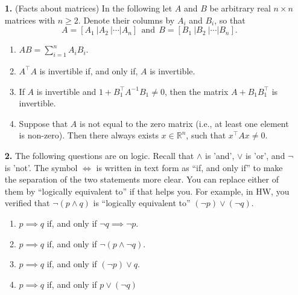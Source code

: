 \documentclass[letterpaper]{article}
\newcommand{\real}{\mathbb R}  %
\begin{document}
\begin{enumerate}
\setlength{\itemsep}{5cm}


\item[{\bf 1.}]  (Facts about matrices) In the following let $A$ and $B$ be arbitrary real $n \times n$ matrices with $n\ge 2$. Denote their columns by $A_i$ and $B_i$, so that $$A=[A_1~| A_2~| \cdots |A_n]~~\text{and}~~B=[B_1~| B_2~| \cdots |B_n].$$
\begin{enumerate}
\setlength{\itemsep}{.15in}
\renewcommand{\labelenumi}{(\alph{enumi})}
\setlength{\itemsep}{.1in}
\item $AB = \sum_{i=1}^{n} A_i B_i$.
\item $A^{\top} A$ is invertible if, and only if, $A$ is invertible.
\item If $A$ is invertible and $1+B_1^{\top} A^{-1} B_1 \neq 0$, then the matrix $A+ B_1 B_1^{\top}$ is invertible.
\item Suppose that $A$ is not equal to the zero matrix (i.e., at least one element is non-zero). Then there always exists $x \in \real^n$, such that $x^{\top} A x \neq0$.
\end{enumerate}


\item[{\bf 2.}] The following questions are on logic. Recall that $\land$ is 'and',  $\lor$ is 'or', and $\neg$ is 'not'.  The symbol  $\Leftrightarrow$ is written in text form as ``if, and only if'' to make the separation of the two statements more clear. You can replace either of them by ``logically equivalent to'' if that helps you. For example, in HW, you verified that $\neg(p \land q)$ is ``logically equivalent to'' $ (\neg p) \lor (\neg q)$.
\begin{enumerate}
\setlength{\itemsep}{.15in}
\renewcommand{\labelenumi}{(\alph{enumi})}
\setlength{\itemsep}{.1in}
\item $p \implies q$ if, and only if $\neg q \implies \neg p$.
\item $p \implies q$ if, and only if $ \neg (p \land \neg q)$.
\item $p \implies q$ if, and only if $ (\neg p) \lor  q$.
\item $p \implies q$ if, and only if $ p \lor  (\neg q)$
\end{enumerate}

\newpage


\end{enumerate}
\end{document}
